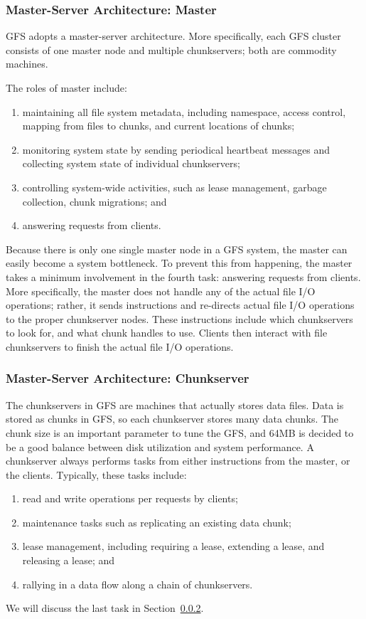 \subsubsection{Master-Server Architecture: Master}
GFS adopts a master-server architecture.
%
More specifically, each GFS cluster consists of one master node and 
multiple chunkservers; both are commodity machines.

The roles of master include:
\begin{enumerate}
\item maintaining all file system metadata, including
	namespace, access control, mapping from files to chunks, and current
	locations of chunks;
\item monitoring system state by sending periodical heartbeat messages and 
	collecting system state of individual chunkservers;
\item controlling system-wide activities, such as lease management, 
	garbage collection, chunk migrations; and
\item answering requests from clients.
\end{enumerate}

Because there is only one single master node in a GFS system, the master can
easily become a system bottleneck.
%
To prevent this from happening, the master takes a minimum involvement
in the fourth task: answering requests from clients.
%
More specifically, the master does not handle any of the actual file I/O
operations; rather, it sends instructions and re-directs actual file I/O 
operations to the proper chunkserver nodes.
%
These instructions include which chunkservers to look for, and what chunk 
handles to use.
%
Clients then interact with file chunkservers to finish the actual file I/O 
operations.


\subsubsection{Master-Server Architecture: Chunkserver}
The chunkservers in GFS are machines that actually stores data files.
%
Data is stored as chunks in GFS, so each chunkserver stores many data chunks.
%
The chunk size is an important parameter to tune the GFS, and 
64MB is decided to be a good balance between disk utilization and 
system performance.
%
A chunkserver always performs tasks from either instructions from the 
master, or the clients. 
%
Typically, these tasks include:
%
\begin{enumerate}
\item read and write operations per requests by clients;
\item maintenance tasks such as replicating an existing data chunk;
\item lease management, including requiring a lease, extending a lease, 
	and releasing a lease; and
\item rallying in a data flow along a chain of chunkservers. 
\end{enumerate}
%
We will discuss the last task in Section~\ref{}.

